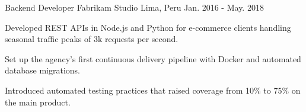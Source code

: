 \begin{cventries}
  \cventry
    {Backend Developer} %
    {Fabrikam Studio} %
    {Lima, Peru} %
    {Jan. 2016 - May. 2018} %
    {
      \begin{cvitems} %
        \item {Developed REST APIs in Node.js and Python for e-commerce clients handling seasonal traffic peaks of 3k requests per second.}
        \item {Set up the agency's first continuous delivery pipeline with Docker and automated database migrations.}
        \item {Introduced automated testing practices that raised coverage from 10\% to 75\% on the main product.}
      \end{cvitems}
    }

\end{cventries}
